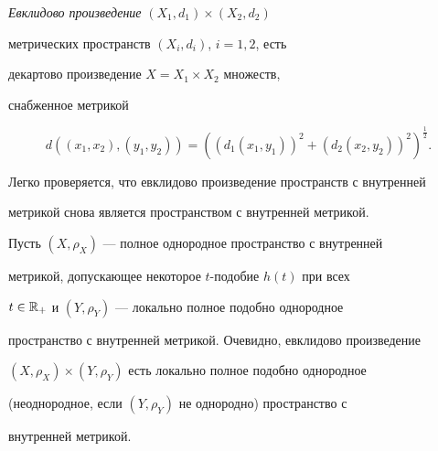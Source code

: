 




\begin{defns}


\label{euc}


{\it Евклидово произведение} $(X_{1},d_{1}) \times (X_{2},d_{2})$


метрических пространств $(X_{i},d_{i})$, $i=1,2$, есть


декартово произведение $X=X_{1} \times X_{2}$ множеств,


снабженное метрикой


$$


d((x_{1},x_{2}),(y_{1},y_{2}))=


((d_{1}(x_{1},y_{1}))^{2}+ (d_{2}(x_{2},y_{2}))^{2})^{\frac{1}{2}}.


$$


\end{defns}





Легко проверяется, что евклидово произведение пространств с внутренней


метрикой снова является пространством с внутренней метрикой.





\begin{exams}


\label{ex5}


Пусть $(X,\rho_{X})$ --- полное однородное пространство с внутренней


метрикой, допускающее некоторое $t$-подобие $h(t)$ при всех


$t \in \Bbb{R}_{+}$ и $(Y,\rho_{Y})$ --- локально полное подобно однородное


пространство с внутренней метрикой. Очевидно, евклидово произведение


$(X,\rho_{X}) \times (Y,\rho_{Y})$ есть локально полное подобно однородное


(неоднородное, если $(Y,\rho_{Y})$ не однородно) пространство с


внутренней метрикой.


\end{exams}





